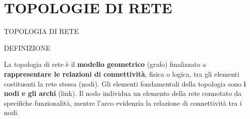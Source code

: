 \documentclass[aspectratio=1610,handout]{beamer}
\begin{document}
\section{TOPOLOGIE DI RETE}

\begin{frame}{TOPOLOGIA DI RETE}
    \begin{alertblock}{DEFINIZIONE}
        \begin{minipage}{0.98\linewidth}
            \justifying
            La topologia di rete è il \textbf{modello geometrico} (grafo) finalizzato a \textbf{rappresentare 
            le relazioni di connettività}, fisica o logica, tra gli elementi costituenti la rete 
            stessa (nodi). Gli elementi fondamentali della topologia sono \textbf{i nodi e gli archi} (link). 
            Il nodo individua un elemento della rete connotato da specifiche funzionalità, 
            mentre l'arco evidenzia la relazione di connettività tra i nodi.
        \end{minipage}
    \end{alertblock}
\end{frame}
\end{document}
